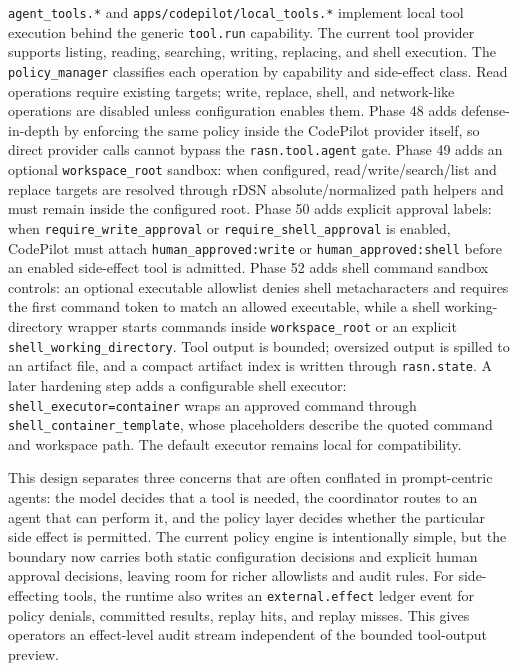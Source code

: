 \documentclass[manuscript,screen,review]{acmart}
\begin{document}
\texttt{agent\_tools.*} and \texttt{apps/codepilot/local\_tools.*} implement local
tool execution behind the generic \texttt{tool.run} capability. The current tool
provider supports listing, reading, searching, writing, replacing, and shell
execution. The \texttt{policy\_manager} classifies each operation by capability
and side-effect class. Read operations require existing targets; write, replace,
shell, and network-like operations are disabled unless configuration enables
them. Phase 48 adds defense-in-depth by enforcing the same policy inside the
CodePilot provider itself, so direct provider calls cannot bypass the
\texttt{rasn.tool.agent} gate. Phase 49 adds an optional
\texttt{workspace\_root} sandbox: when configured, read/write/search/list and
replace targets are resolved through rDSN absolute/normalized path helpers and
must remain inside the configured root. Phase 50 adds explicit approval labels:
when \texttt{require\_write\_approval} or
\texttt{require\_shell\_approval} is enabled, CodePilot must attach
\texttt{human\_approved:write} or \texttt{human\_approved:shell} before an
enabled side-effect tool is admitted. Phase 52 adds shell command sandbox
controls: an optional executable allowlist denies shell metacharacters and
requires the first command token to match an allowed executable, while a shell
working-directory wrapper starts commands inside \texttt{workspace\_root} or an
explicit \texttt{shell\_working\_directory}. Tool output is bounded; oversized
output is spilled to an artifact file, and a compact artifact index is written
through \texttt{rasn.state}. A later hardening step adds a configurable shell
executor: \texttt{shell\_executor=container} wraps an approved command through
\texttt{shell\_container\_template}, whose placeholders describe the quoted
command and workspace path. The default executor remains local for compatibility.

This design separates three concerns that are often conflated in prompt-centric
agents: the model decides that a tool is needed, the coordinator routes to an
agent that can perform it, and the policy layer decides whether the particular
side effect is permitted. The current policy engine is intentionally simple, but
the boundary now carries both static configuration decisions and explicit human
approval decisions, leaving room for richer allowlists and audit rules.
For side-effecting tools, the runtime also writes an \texttt{external.effect}
ledger event for policy denials, committed results, replay hits, and replay
misses. This gives operators an effect-level audit stream independent of the
bounded tool-output preview.
\end{document}
